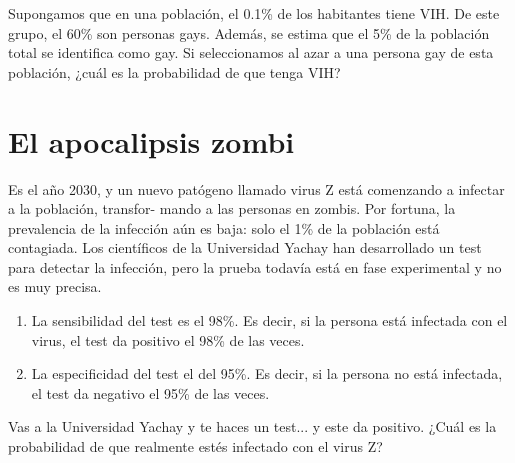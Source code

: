 \documentclass[a4paper]{article}
\begin{document}
Supongamos que en una población, el 0.1\% de los habitantes tiene VIH. De este grupo, el 60\% son personas gays. Además, se estima que el 5\% de la población total se identifica como gay. Si seleccionamos al azar a una persona gay de esta población, ¿cuál es la probabilidad de que tenga VIH?

\section{El  apocalipsis zombi}

Es el año 2030, y un nuevo patógeno llamado virus Z está comenzando a infectar a la población, transfor-
mando a las personas en zombis. Por fortuna, la prevalencia de la infección aún es baja: solo el 1\% de la población está contagiada. Los científicos de la Universidad Yachay han desarrollado un test para detectar la infección, pero la prueba todavía está en fase experimental y no es muy precisa.

\begin{enumerate}[label=•]
	\item La sensibilidad del test es el 98\%. Es decir, si la persona está infectada con el virus, el test da positivo el 98\% de las veces.
	\item La especificidad del test el del 95\%. Es decir, si la persona no está infectada, el test da negativo el 95\% de las veces.
\end{enumerate}

Vas a la Universidad Yachay y te haces un test... y este da positivo. ¿Cuál es la probabilidad de que realmente estés infectado con el virus Z?
\end{document}
